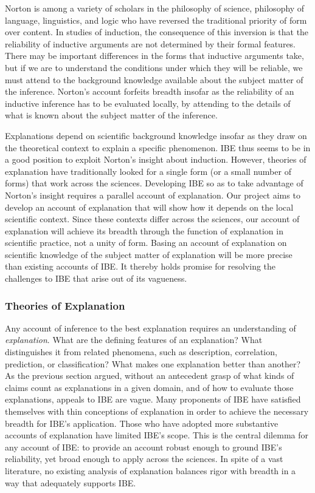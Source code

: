 \documentclass{article}[11pt]
\begin{document}
Norton is among a variety of scholars in the philosophy of science, philosophy of language, linguistics, and logic who have reversed the traditional priority of form over content.  In studies of induction, the consequence of this inversion is that the reliability of inductive arguments are not determined by their formal features. There may be important differences in the forms that inductive arguments take, but if we are to understand the conditions under which they will be reliable, we must attend to the background knowledge available about the subject matter of the inference.  Norton's account forfeits breadth insofar as the reliability of an inductive inference has to be evaluated locally, by attending to the details of what is known about the subject matter of the inference.  


Explanations depend on scientific background knowledge insofar as they draw on the theoretical context to explain a specific phenomenon.  IBE thus seems to be in a good position to exploit Norton's insight about induction.  However, theories of explanation have traditionally looked for a single form (or a small number of forms) that work across the sciences. Developing IBE so as to take advantage of Norton's insight requires a parallel account of explanation.  Our project aims to develop an account of explanation that will show how it depends on the local scientific context.  Since these contexts differ across the sciences, our account of explanation will achieve its breadth through the function of explanation in scientific practice,  not a unity of form.  Basing an account of explanation on scientific knowledge of the subject matter of explanation will be more precise than existing accounts of IBE.  It thereby holds promise for resolving the challenges to IBE that arise out of its vagueness. 


\subsubsection*{Theories of Explanation}

Any account of inference to the best explanation requires an understanding of \textit{explanation}. What are the defining features of an explanation? What distinguishes it from related phenomena, such as description, correlation, prediction, or classification? What makes one explanation better than another? As the previous section argued, without an antecedent grasp of what kinds of claims count as explanations in a given domain, and of how to evaluate those explanations, appeals to IBE are vague.  Many proponents of IBE have satisfied themselves with thin conceptions of explanation in order to achieve the necessary breadth for IBE's application.  Those who have adopted more substantive accounts of explanation have limited IBE's scope.  This is the central dilemma for any account of IBE: to provide an account robust enough to ground IBE's reliability, yet broad enough to apply across the sciences.  In spite of a vast literature, no existing analysis of explanation balances rigor with breadth in a way that adequately supports IBE.  
\end{document}
